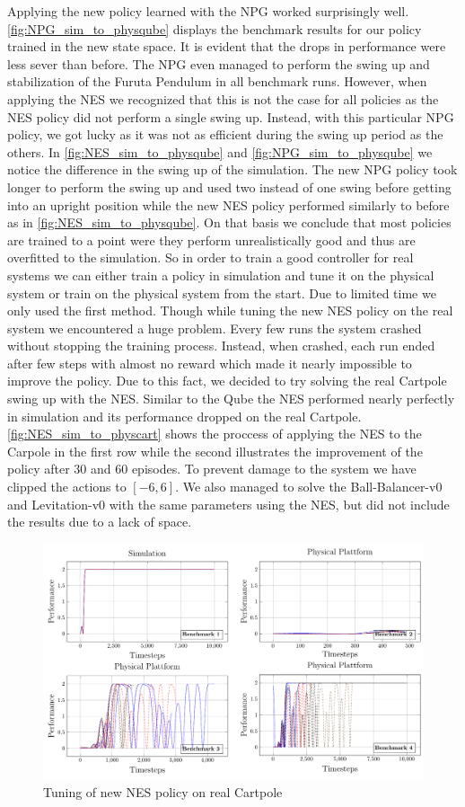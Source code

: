 Applying the new policy learned with the NPG worked surprisingly well. \autoref{fig:NPG_sim_to_physqube} displays the benchmark results for our policy trained in the new state space. It is evident that the drops in performance were less sever than before. The NPG even managed to perform the swing up and stabilization of the Furuta Pendulum in all benchmark runs. However, when applying the NES we recognized that this is not the case for all policies as the NES policy did not perform a single swing up. Instead, with this particular NPG policy, we got lucky as it was not as efficient during the swing up period as the others. In \autoref{fig:NES_sim_to_physqube} and \ref{fig:NPG_sim_to_physqube} we notice the difference in the swing up of the simulation. The new NPG policy took longer to perform the swing up and used two instead of one swing before getting into an upright position while the new NES policy performed similarly to before as in \autoref{fig:NES_sim_to_physqube}. On that basis we conclude that most policies are trained to a point were they perform unrealistically good and thus are overfitted to the simulation.
So in order to train a good controller for real systems we can either train a policy in simulation and tune it on the physical system or train on the physical system from the start. Due to limited time we only used the first method.
Though while tuning the new NES policy on the real system we encountered a huge problem. Every few runs the system crashed without stopping the training process. Instead, when crashed, each run ended after few steps with almost no reward which made it nearly impossible to improve the policy. Due to this fact, we decided to try solving the real Cartpole swing up with the NES. Similar to the Qube the NES performed nearly perfectly in simulation and its performance dropped on the real Cartpole. \autoref{fig:NES_sim_to_physcart} shows the proccess of applying the NES to the Carpole in the first row while the second illustrates the improvement of the policy after 30 and 60 episodes. To prevent damage to the system we have clipped the actions to $[-6, 6]$. We also managed to solve the Ball-Balancer-v0 and Levitation-v0 with the same parameters using the NES, but did not include the results due to a lack of space.
\begin{figure}
\centering
\includegraphics[scale=.5]{plots/training_on_rr.pdf}
\caption{Tuning of new NES policy on real Cartpole}
\label{fig:NES_sim_to_physcart}
\end{figure}
